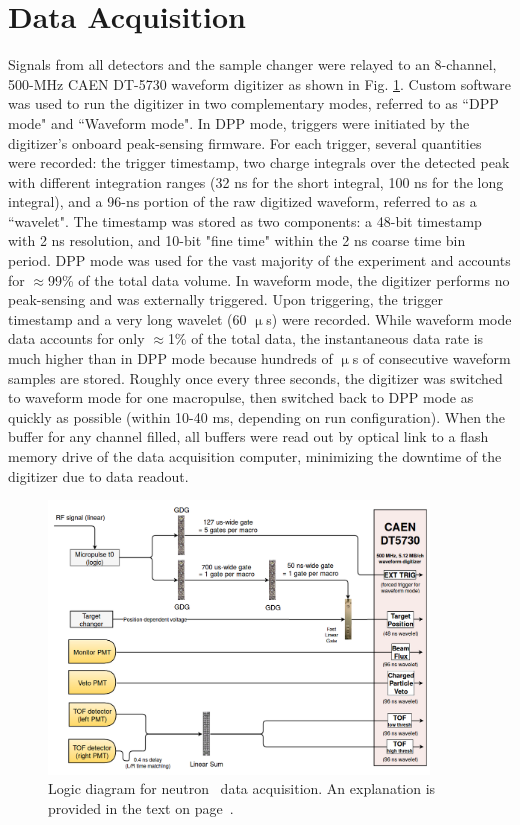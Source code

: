 \section{Data Acquisition} \label{DataAcquisition}
Signals from all detectors and the sample changer were relayed to an 8-channel, 500-MHz CAEN 
DT-5730
waveform digitizer as shown in Fig. \ref{TCSLogicDiagram}. Custom software was used to run the 
digitizer in two complementary modes, referred to as ``DPP mode" and ``Waveform 
mode". In DPP mode, triggers were initiated by the digitizer's onboard
peak-sensing firmware. For each trigger, several quantities were recorded: the trigger 
timestamp, two charge integrals over the detected peak with different
integration ranges (32 ns for the short integral, 100 ns for the long integral),
and a 96-ns portion of the raw digitized waveform, referred to as a ``wavelet".
The timestamp was stored as two components: a 48-bit timestamp with 2 ns
resolution, and 10-bit "fine time" within the 2 ns coarse time bin period.
DPP mode was used for the vast majority of the 
experiment and accounts for $\approx$99\% of the total data volume. In waveform mode, 
the digitizer performs no peak-sensing and was externally triggered. Upon 
triggering, the trigger timestamp and a very long wavelet (60 $\upmu$s) 
were recorded. While waveform mode data accounts for only $\approx$1\% of the total data, 
the instantaneous data rate is much higher than in DPP 
mode because hundreds of $\upmu$s of consecutive waveform samples are 
stored. Roughly once every three seconds, the digitizer was switched to 
waveform mode for one macropulse, then switched back to DPP mode as quickly as
possible (within 10-40 ms, depending on run configuration). When the buffer for
any channel filled, all buffers were read out by optical link to a flash memory
drive of the data acquisition computer, minimizing the downtime of the digitizer
due to data readout.

\begin{figure}
    \centering
    \includegraphics[width=0.9\textwidth]{figures/TCSLogicDiagram.png}
    \caption[Logic diagram for neutron \tot\ data acquisition]
    {Logic diagram for neutron \tot\ data acquisition. An explanation is provided in the text on
        page~\pageref{DataAcquisition}.}
    \label{TCSLogicDiagram}
\end{figure}

